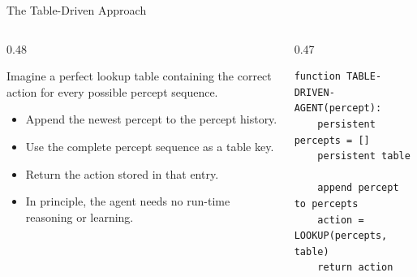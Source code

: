 \documentclass[aspectratio=169,10pt]{beamer}
\begin{document}

\begin{frame}[fragile]{The Table-Driven Approach}
  \begin{columns}[T,onlytextwidth]
    \begin{column}{0.48\textwidth}
      \begin{keyidea}
        Imagine a perfect lookup table containing the correct action for every possible percept sequence.
      \end{keyidea}
      \vspace{0.08in}
      \begin{itemize}
        \item Append the newest percept to the percept history.
        \item Use the complete percept sequence as a table key.
        \item Return the action stored in that entry.
        \item In principle, the agent needs no run-time reasoning or learning.
      \end{itemize}
    \end{column}
    \begin{column}{0.47\textwidth}
\begin{verbatim}
function TABLE-DRIVEN-AGENT(percept):
    persistent percepts = []
    persistent table

    append percept to percepts
    action = LOOKUP(percepts, table)
    return action
\end{verbatim}
    \end{column}
  \end{columns}
\end{frame}
\end{document}
